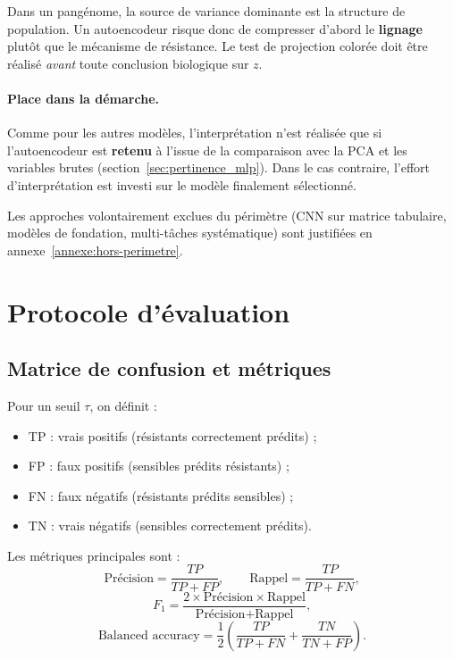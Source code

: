 \documentclass[11pt,a4paper]{article}
\begin{document}
\begin{warnbox}
Dans un pangénome, la source de variance dominante est la structure de population. Un autoencodeur risque donc de compresser d'abord le \textbf{lignage} plutôt que le mécanisme de résistance. Le test de projection colorée doit être réalisé \emph{avant} toute conclusion biologique sur \(z\).
\end{warnbox}

\paragraph{Place dans la démarche.}
Comme pour les autres modèles, l'interprétation n'est réalisée que si l'autoencodeur est \textbf{retenu} à l'issue de la comparaison avec la PCA et les variables brutes (section~\ref{sec:pertinence_mlp}). Dans le cas contraire, l'effort d'interprétation est investi sur le modèle finalement sélectionné.

Les approches volontairement exclues du périmètre (CNN sur matrice tabulaire, modèles de fondation, multi-tâches systématique) sont justifiées en annexe~\ref{annexe:hors-perimetre}.

\section{Protocole d'évaluation}

\subsection{Matrice de confusion et métriques}

Pour un seuil \(\tau\), on définit :
\begin{itemize}[leftmargin=1.2em]
    \item TP : vrais positifs (résistants correctement prédits) ;
    \item FP : faux positifs (sensibles prédits résistants) ;
    \item FN : faux négatifs (résistants prédits sensibles) ;
    \item TN : vrais négatifs (sensibles correctement prédits).
\end{itemize}

Les métriques principales sont :
\[
\text{Précision} = \frac{TP}{TP+FP},
\qquad
\text{Rappel} = \frac{TP}{TP+FN},
\]
\[
F_1 = \frac{2 \times \text{Précision} \times \text{Rappel}}{\text{Précision} + \text{Rappel}},
\]
\[
\text{Balanced accuracy}
=
\frac{1}{2}
\left(
\frac{TP}{TP+FN}
+
\frac{TN}{TN+FP}
\right).
\]
\end{document}
